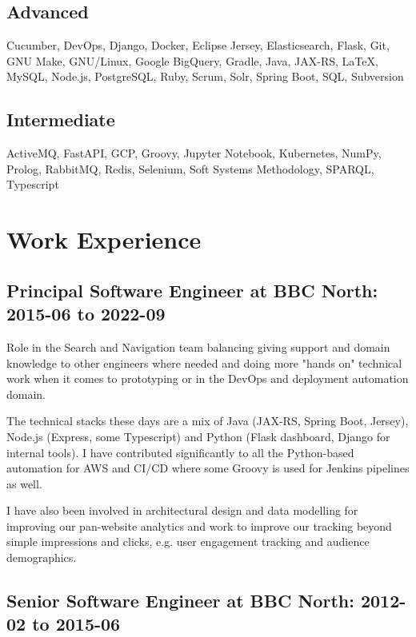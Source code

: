 \documentclass[10pt]{article}
\begin{document}
\subsection*{Advanced}

Cucumber, DevOps, Django, Docker, Eclipse Jersey, Elasticsearch, Flask, Git, GNU Make, GNU/Linux, Google BigQuery, Gradle, Java, JAX-RS, LaTeX, MySQL, Node.js, PostgreSQL, Ruby, Scrum, Solr, Spring Boot, SQL, Subversion

\subsection*{Intermediate}

ActiveMQ, FastAPI, GCP, Groovy, Jupyter Notebook, Kubernetes, NumPy, Prolog, RabbitMQ, Redis, Selenium, Soft Systems Methodology, SPARQL, Typescript


\vfill

\section*{Work Experience}



\subsection*{Principal Software Engineer at BBC North: 2015-06 to 2022-09}


Role in the Search and Navigation team balancing giving support and domain
knowledge to other engineers where needed
and doing more "hands on" technical work when it comes to prototyping
or in the DevOps and deployment automation domain.

The technical stacks these days are a mix of Java (JAX-RS, Spring Boot, Jersey),
Node.js (Express, some Typescript) and Python (Flask dashboard, Django for
internal tools).
I have contributed significantly to all the Python-based
automation for AWS and CI/CD where some Groovy is used for Jenkins pipelines
as well.

I have also been involved in architectural design and data modelling for
improving our pan-website analytics and work to improve our tracking beyond
simple impressions and clicks, e.g. user engagement tracking and audience
demographics.




\subsection*{Senior Software Engineer at BBC North: 2012-02 to 2015-06}
\end{document}
